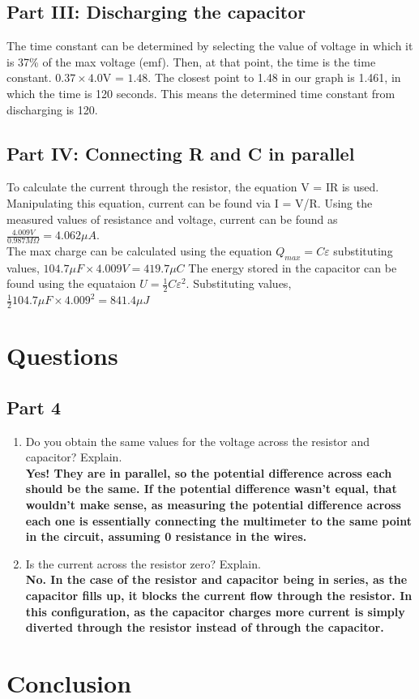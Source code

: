 \documentclass[titlepage]{article}
\begin{document}
	\subsection{Part III: Discharging the capacitor}
	The time constant can be determined by selecting the value of voltage in which it is 37\% of the max voltage (emf). Then, at that point, the time is the time constant. $0.37 \times 4.0$V = $1.48$. The closest point to 1.48 in our graph is 1.461, in which the time is 120 seconds. This means the determined time constant from discharging is 120.
	\subsection{Part IV: Connecting R and C in parallel}
	To calculate the current through the resistor, the equation V = IR is used. Manipulating this equation, current can be found via I = V/R. Using the measured values of resistance and voltage, current can be found as $\frac{4.009V}{0.987M\Omega} = 4.062\mu A$.\\
	The max charge can be calculated using the equation $Q_{max} = C\varepsilon$ substituting values, $104.7\mu F \times 4.009V = 419.7\mu C$
	The energy stored in the capacitor can be found using the equataion $U = \frac{1}{2}C\varepsilon^2$. Substituting values, $\frac{1}{2}104.7\mu F \times 4.009^2 = 841.4\mu J$
	\section{Questions}
    \subsection{Part 4}
    \begin{enumerate}
        \item Do you obtain the same values for the voltage across the resistor and capacitor? Explain.\\ 
            \textbf{Yes! They are in parallel, so the potential difference across each should be the same. If the potential difference wasn’t equal, that wouldn’t make sense, as measuring the potential difference across each one is essentially connecting the multimeter to the same point in the circuit, assuming 0 resistance in the wires.}
        \item Is the current across the resistor zero? Explain.\\ 
            \textbf{No. In the case of the resistor and capacitor being in series, as the capacitor fills up, it blocks the current flow through the resistor. In this configuration, as the capacitor charges more current is simply diverted through the resistor instead of through the capacitor.}



    \end{enumerate}

	\section{Conclusion}
\end{document}
